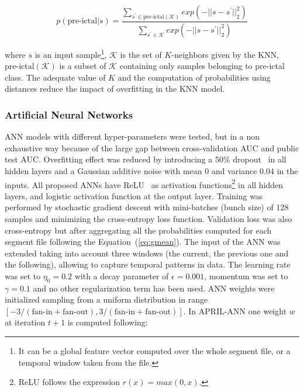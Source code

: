 \documentclass[a4paper,english,twoside]{article}
\begin{document}
\begin{equation}
p(\text{pre-ictal} | s) =
\displaystyle{\frac{\displaystyle{\sum_{ s^\prime \in \text{pre-ictal}(\mathcal{K}) } exp( -||s - s^\prime||^2_2 ) }}
{\displaystyle{\sum_{s^\prime \in \mathcal{K}} exp( -||s - s^\prime||^2_2 ) }}}
\end{equation}

\noindent where $s$ is an input sample\footnote{It can be a global feature
  vector computed over the whole segment file, or a temporal window taken from
  the file.}, $\mathcal{K}$ is the set of $K$-neighbors given by the KNN,
$\text{pre-ictal}(\mathcal{K})$ is a subset of $\mathcal{K}$ containing only
samples belonging to pre-ictal class. The adequate value of $K$ and the
computation of probabilities using distances reduce the impact of overfitting in
the KNN model.

\subsubsection{Artificial Neural
  Networks}\label{artificial-neural-networks}

ANN models with different hyper-parameters were tested, but in a non exhaustive
way because of the large gap between cross-validation AUC and public test
AUC. Overfitting effect was reduced by introducing a 50\%
dropout~\cite{2012:arxiv:hinton:dropout} in all hidden layers and a Gaussian
additive noise with mean $0$ and variance $0.04$ in the inputs. All proposed
ANNs have ReLU~\cite{2011:glorot:aistats} as activation functions\footnote{ReLU
  follows the expression $r(x) = max(0,x)$.} in all hidden layers, and logistic
activation function at the output layer. Training was performed by stochastic
gradient descent with mini-batches (bunch size) of 128 samples and minimizing
the cross-entropy loss function. Validation loss was also cross-entropy but
after aggregating all the probabilities computed for each segment file following
the Equation~(\ref{eq:gmean}). The input of the ANN was extended taking into
account three windows (the current, the previous one and the following),
allowing to capture temporal patterns in data. The learning rate was set to
$\eta_0=0.2$ with a decay parameter of $\epsilon=0.001$, momentum was set to
$\gamma=0.1$ and no other regularization term has been used. ANN weights were
initialized sampling from a uniform distribution in range $[-3/(\text{fan-in} +
  \text{fan-out}),3/(\text{fan-in} + \text{fan-out})]$. In APRIL-ANN one weight
$w$ at iteration $t+1$ is computed following:
\end{document}

